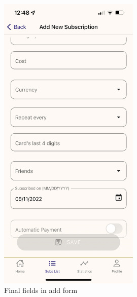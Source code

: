 \documentclass[11pt]{article}
\begin{document}
\begin{figure}[h!]
    \centering
    \begin{minipage}[c]{0.45\textwidth}
        \centering
        \includegraphics[width=0.6\textwidth, clip]{../../assets/smartphone/add2.PNG}
        \caption{Final fields in add form}
        \label{fig:add2}
    \end{minipage}\hspace{1cm}%
    \begin{minipage}[c]{0.45\textwidth}
        \centering

\end{minipage}
\end{figure}
\end{document}
